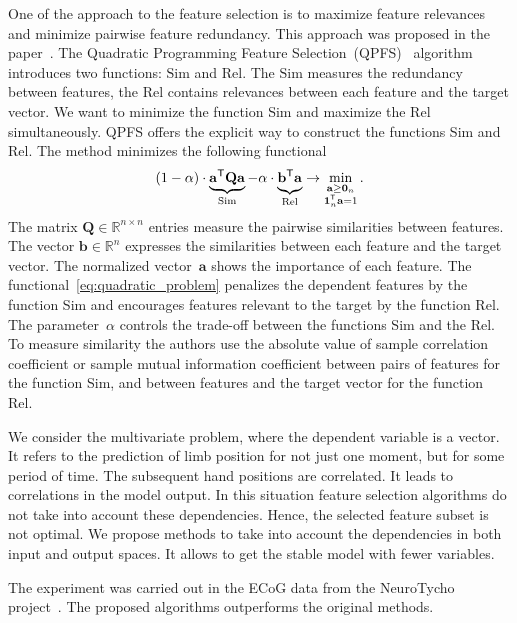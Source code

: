 \documentclass[12pt,twoside]{article}
\theoremstyle{definition}
\newcommand{\ba}{\mathbf{a}}
\newcommand{\bb}{\mathbf{b}}
\newcommand{\bQ}{\mathbf{Q}}
\newcommand{\bbR}{\mathbb{R}}
\newcommand{\T}{\mathsf{T}}
\newcommand{\bOne}{\boldsymbol{1}}
\newcommand{\bZero}{\boldsymbol{0}}
\begin{document}
One of the approach to the feature selection is to maximize feature relevances and minimize pairwise feature redundancy. 
This approach was proposed in the paper~\cite{ding2005minimum}.
The Quadratic Programming Feature Selection~(QPFS)~\cite{rodriguez2010quadratic,katrutsa2017comprehensive} algorithm introduces two functions: $\text{Sim}$ and $\text{Rel}$.
The $\text{Sim}$ measures the redundancy between features, the $\text{Rel}$ contains relevances between each feature and the target vector.
We want to minimize the function Sim and maximize the Rel simultaneously.
QPFS offers the explicit way to construct the functions Sim and Rel.
The method minimizes the following functional
\begin{equation}
(1 - \alpha) \cdot \underbrace{\ba^{\T} \bQ \ba}_{\text{Sim}} - \alpha \cdot \underbrace{\vphantom{()} \bb^{\T} \ba}_{\text{Rel}} \rightarrow \min_{\substack{\ba \geq \bZero_n \\ \bOne_n^{\T} \ba=1}}.
\label{eq:quadratic_problem}
\end{equation}
The matrix $\bQ \in \bbR^{n \times n}$ entries measure the pairwise similarities between features.
The vector $\bb \in \bbR^n$ expresses the similarities between each feature and the target vector.
The normalized vector~$\ba$ shows the importance of each feature.
The functional~\eqref{eq:quadratic_problem} penalizes the dependent features by the function Sim and encourages features relevant to the target by the function Rel.
The parameter~$\alpha$ controls the trade-off between the functions Sim and the Rel.
To measure similarity the authors use the absolute value of sample correlation coefficient or sample mutual information coefficient between pairs of features for the function Sim, and between features and the target vector for the function Rel.

We consider the multivariate problem, where the dependent variable is a vector. 
It refers to the prediction of limb position for not just one moment, but for some period of time. 
The subsequent hand positions are correlated. 
It leads to correlations in the model output. 
In this situation feature selection algorithms do not take into account these dependencies.
Hence, the selected feature subset is not optimal.
We propose methods to take into account the dependencies in both input and output spaces. 
It allows to get the stable model with fewer variables.

The experiment was carried out in the ECoG data from the NeuroTycho project~\cite{neurotycho}. 
The proposed algorithms outperforms the original methods.
\end{document}
